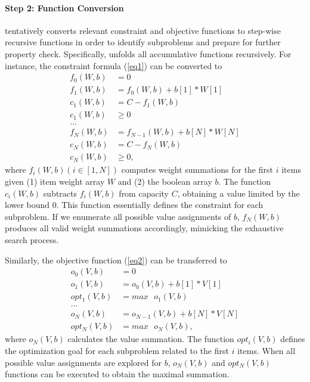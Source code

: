 \paragraph{Step 2: Function Conversion}
\tool tentatively converts relevant constraint and objective functions to step-wise recursive functions in order to identify subproblems and prepare for further property check. 
Specifically, 
\tool unfolds all accumulative functions 
recursively. 
For instance, the constraint formula (\ref{eq1}) can be converted to
\begin{align}
\label{fun1}
f_0(W, b)&=0 \nonumber\\
f_1(W, b)&=f_0(W, b) + b[1] * W[1] \nonumber\\
c_1(W, b)&=C-f_1(W, b)\nonumber\\
c_1(W, b)&\ge0 \nonumber\\
\ldots \tag{3.3}\\  
f_N(W, b)&=f_{N-1}(W, b) + b[N] * W[N] \nonumber\\
c_N(W, b)&=C-f_N(W, b) \nonumber\\
c_N(W, b)& \ge 0, \nonumber
\end{align}
where $f_i(W, b) (i\in[1, N])$ computes weight summations for the first $i$ items given (1) item weight array $W$ and (2) the boolean array $b$.
The function $c_i(W, b)$ subtracts $f_i(W, b)$ from capacity $C$, obtaining a value limited by the lower bound $0$. This function essentially defines the constraint for each subproblem.  
If we enumerate all possible value assignments of $b$, $f_N(W, b)$ produces all valid weight summations accordingly, mimicking the exhaustive search process. 

Similarly, the objective function (\ref{eq2}) can be transferred to
\begin{align}
\label{fun2}
o_0(V, b)&=0 \nonumber\\
o_1(V, b)&=o_0(V, b) + b[1] * V[1]\nonumber\\
opt_1(V, b)&=max \text{ }o_1(V, b) \nonumber\\
\ldots \tag{3.4}\\
o_N(V, b)&=o_{N-1}(V, b) + b[N] * V[N]\nonumber\\
opt_N(V, b)&=max\text{ }o_N(V, b), \nonumber
\end{align}
where $o_N(V, b)$ calculates the value summation.
The function $opt_i(V, b)$ defines the optimization goal for each subproblem related to the first $i$ items. When all possible value assignments are explored for $b$, $o_N(V, b)$ and $opt_N(V, b)$ functions can be executed to obtain the maximal summation. 

